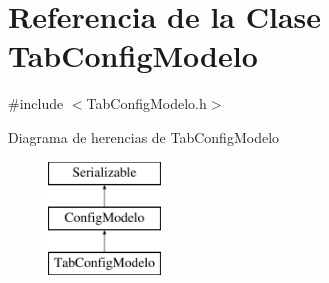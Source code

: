 \hypertarget{classTabConfigModelo}{\section{\-Referencia de la \-Clase \-Tab\-Config\-Modelo}
\label{classTabConfigModelo}
}


{\ttfamily \#include $<$\-Tab\-Config\-Modelo.\-h$>$}

\-Diagrama de herencias de \-Tab\-Config\-Modelo\begin{figure}[H]
\begin{center}
\leavevmode
\includegraphics[height=3.000000cm]{classTabConfigModelo}
\end{center}
\end{figure}
